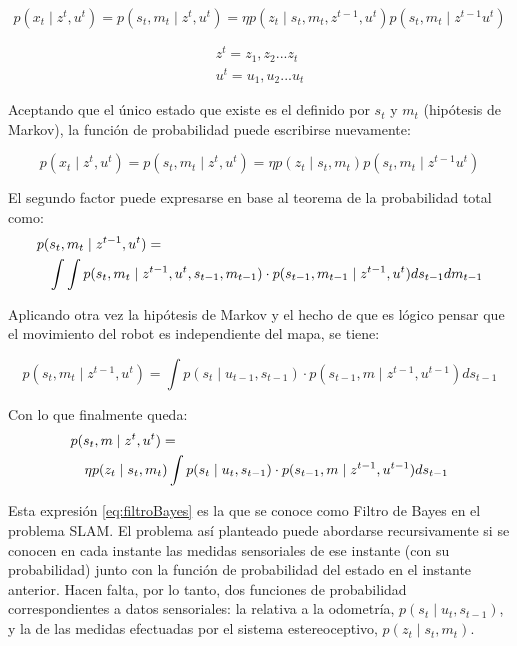 \begin{equation}\label{eq:prob_estado}
    p(x_{t}\mid z^{t},u^{t}) = p(s_{t},m_{t}\mid z^{t},u^{t})=\eta p(z_{t}\mid s_{t},m_{t},z^{t-1},u^{t})p(s_{t},m_{t}\mid z^{t-1}u^{t})
\end{equation}


\begin{eqnarray}
    z^{t} = z_{1},z_{2}...z_{t} \nonumber\\
    u^{t} = u_{1},u_{2}...u_{t}
\end{eqnarray}

Aceptando que el único estado que existe es el definido por $s_{t}$ y $m_{t}$ (hipótesis de Markov), la función de probabilidad puede escribirse nuevamente:

\begin{equation}\label{eq:prob_markov}
    p(x_{t}\mid z^{t},u^{t}) = p(s_{t},m_{t}\mid z^{t},u^{t}) = \eta p(z_{t}\mid s_{t},m_{t})p(s_{t},m_{t}\mid z^{t-1}u^{t})
\end{equation}

El segundo factor puede expresarse en base al teorema de la probabilidad total como:
\begin{eqnarray}\label{eq:prob_total}
  \lefteqn{p(s_{t},m_{t}\mid z^{t-1},u^{t}) =} \\
	&&  \int\int p(s_{t},m_{t}\mid z^{t-1},u^{t},s_{t-1},m_{t-1}) 
 	\cdot p(s_{t-1},m_{t-1}\mid z^{t-1},u^{t}) ds_{t-1}dm_{t-1}  \nonumber
\end{eqnarray}

Aplicando otra vez la hipótesis de Markov y el hecho de que es lógico pensar que el movimiento del robot es independiente del mapa, se tiene:

\begin{equation}\label{eq:termino2}
    p(s_{t},m_{t}\mid z^{t-1},u^{t}) = \int p(s_{t}\mid u_{t-1},s_{t-1})
    \cdot p(s_{t-1},m\mid z^{t-1},u^{t-1})ds_{t-1}
\end{equation}


Con lo que finalmente queda:
\begin{eqnarray}\label{eq:filtroBayes}
  \lefteqn{p(s_{t},m\mid z^{t},u^{t}) = } \\
  && \eta p(z_{t}\mid s_{t},m_{t})\int p(s_{t}\mid u_{t},s_{t-1})
  \cdot p(s_{t-1},m\mid z^{t-1},u^{t-1})ds_{t-1} \nonumber
\end{eqnarray}

Esta expresión \ref{eq:filtroBayes} es la que se conoce como Filtro de Bayes en el problema SLAM. El problema así planteado puede abordarse recursivamente si se conocen en cada instante las medidas sensoriales de ese instante (con su probabilidad) junto con la función de probabilidad del estado en el instante anterior.
Hacen falta, por lo tanto, dos funciones de probabilidad correspondientes a datos sensoriales: la relativa a la odometría, $p(s_{t}\mid u_{t},s_{t-1})$, y la de las medidas efectuadas por el sistema estereoceptivo, $p(z_{t}\mid s_{t},m_{t})$.

